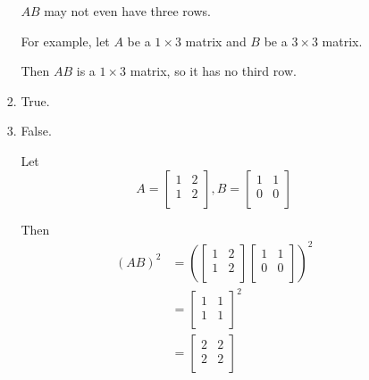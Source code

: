 \documentclass[12pt,letterpaper]{article}
\begin{document}
\begin{enumerate}
\begin{enumerate}
\begin{enumerate}[label=(\alph*)]
              $AB$ may not even have three rows.

              For example, let $A$ be a $1 \times 3$ matrix and $B$ be a $3 \times 3$ matrix.

              Then $AB$ is a $1 \times 3$ matrix, so it has no third row.
            \item True.
            \item

              False.

              Let
              \[
                A = \begin{bmatrix}
                  1 & 2 \\
                  1 & 2 \\
                \end{bmatrix}
                ,
                B = \begin{bmatrix}
                  1 & 1 \\
                  0 & 0 \\
                \end{bmatrix}
              \]

              Then
              \begin{align*}
                (AB)^2
                &= \left(\begin{bmatrix}
                  1 & 2 \\
                  1 & 2 \\
                \end{bmatrix}
                \begin{bmatrix}
                  1 & 1 \\
                  0 & 0 \\
                \end{bmatrix}\right)^2 \\
                &= \begin{bmatrix}
                  1 & 1 \\
                  1 & 1 \\
                \end{bmatrix}^2 \\
                &= \begin{bmatrix}
                  2 & 2 \\
                  2 & 2 \\
                \end{bmatrix} \\
              \end{align*}


\end{enumerate}
\end{enumerate}
\end{enumerate}
\end{document}
